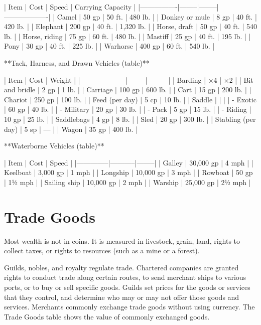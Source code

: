 | Item           | Cost   | Speed  | Carrying Capacity |
|----------------|--------|--------|-------------------|
| Camel          | 50 gp  | 50 ft. | 480 lb.           |
| Donkey or mule | 8 gp   | 40 ft. | 420 lb.           |
| Elephant       | 200 gp | 40 ft. | 1,320 lb.         |
| Horse, draft   | 50 gp  | 40 ft. | 540 lb.           |
| Horse, riding  | 75 gp  | 60 ft. | 480 lb.           |
| Mastiff        | 25 gp  | 40 ft. | 195 lb.           |
| Pony           | 30 gp  | 40 ft. | 225 lb.           |
| Warhorse       | 400 gp | 60 ft. | 540 lb.           |

**Tack, Harness, and Drawn Vehicles (table)**

| Item               | Cost   | Weight  |
|--------------------|--------|---------|
| Barding            | ×4     | ×2      |
| Bit and bridle     | 2 gp   | 1 lb.   |
| Carriage           | 100 gp | 600 lb. |
| Cart               | 15 gp  | 200 lb. |
| Chariot            | 250 gp | 100 lb. |
| Feed (per day)     | 5 cp   | 10 lb.  |
| Saddle      |        |         |
| - Exotic           | 60 gp  | 40 lb.  |
| - Military         | 20 gp  | 30 lb.  |
| - Pack             | 5 gp   | 15 lb.  |
| - Riding           | 10 gp  | 25 lb.  |
| Saddlebags         | 4 gp   | 8 lb.   |
| Sled               | 20 gp  | 300 lb. |
| Stabling (per day) | 5 sp   | —       |
| Wagon              | 35 gp  | 400 lb. |

**Waterborne Vehicles (table)**

| Item         | Cost      | Speed  |
|--------------|-----------|--------|
| Galley       | 30,000 gp | 4 mph  |
| Keelboat     | 3,000 gp  | 1 mph  |
| Longship     | 10,000 gp | 3 mph  |
| Rowboat      | 50 gp     | 1½ mph |
| Sailing ship | 10,000 gp | 2 mph  |
| Warship      | 25,000 gp | 2½ mph |

\section{Trade Goods}

Most wealth is not in coins. It is measured in livestock, grain, land, rights to collect taxes, or rights to resources (such as a mine or a forest).

Guilds, nobles, and royalty regulate trade. Chartered companies are granted rights to conduct trade along certain routes, to send merchant ships to various ports, or to buy or sell specific goods. Guilds set prices for the goods or services that they control, and determine who may or may not offer those goods and services. Merchants commonly exchange trade goods without using currency. The Trade Goods table shows the value of commonly exchanged goods.

